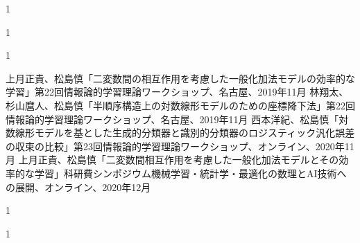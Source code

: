 \begin{公開}{1}

\end{公開}

\begin{特許}{1}

\end{特許}

\begin{発表}{1}

 上月正貴、松島慎「二変数間の相互作用を考慮した一般化加法モデルの効率的な学習」第22回情報論的学習理論ワークショップ、名古屋、2019年11月
 林翔太、杉山麿人、松島慎「半順序構造上の対数線形モデルのための座標降下法」第22回情報論的学習理論ワークショップ、名古屋、2019年11月
 西本洋紀、松島慎「対数線形モデルを基とした生成的分類器と識別的分類器のロジスティック汎化誤差の収束の比較」第23回情報論的学習理論ワークショップ、オンライン、2020年11月
 上月正貴、松島慎「二変数間相互作用を考慮した一般化加法モデルとその効率的な学習」科研費シンポジウム機械学習・統計学・最適化の数理とAI技術への展開、オンライン、2020年12月
\end{発表}

\begin{特記}{1}

\end{特記}

\begin{報道}{1}

\end{報道}
